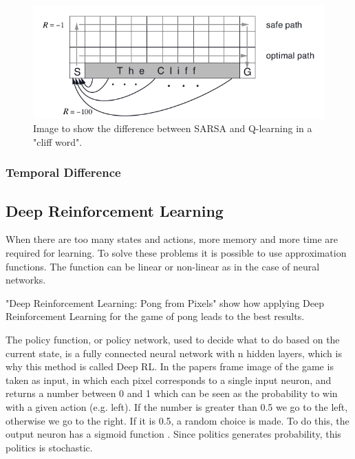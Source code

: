 \begin{figure}[ht]
    \centering
    \includegraphics[scale=0.4]{images/cliff_word.png}
    \caption{Image to show the difference between SARSA and Q-learning in a "cliff word".}
\end{figure}

\subsubsection{Temporal Difference}

\subsection{Deep Reinforcement Learning}
When there are too many states and actions, more memory and more time are required for learning.
To solve these problems it is possible to use approximation functions.
The function can be linear \cite{melo2008analysis} or non-linear as in the case of neural networks.

\vspace*{4mm}
\noindent
"Deep Reinforcement Learning: Pong from Pixels" \cite{karpathy2016deep} show how applying Deep Reinforcement Learning for the game of pong leads to the best results.

The policy function, or policy network, used to decide what to do based on the current state, is a fully connected neural network with n hidden layers, which is why this method is called Deep RL. In the papers frame image of the game is taken as input, in which each pixel corresponds to a single input neuron, and returns a number between 0 and 1 which can be seen as the probability to win with a given action (e.g. left). If the number is greater than 0.5 we go to the left, otherwise we go to the right. If it is 0.5, a random choice is made. To do this, the output neuron has a sigmoid function \cite{mnih2013playing}\cite{karpathy2016deep}.
Since politics generates probability, this politics is stochastic.

